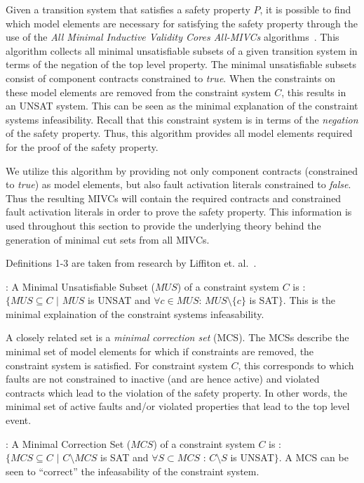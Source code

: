 Given a transition system that satisfies a safety property $P$, it is possible to find which model elements are necessary for satisfying the safety property through the use of the \textit{All Minimal Inductive Validity Cores All-MIVCs} algorithms~\cite{Ghassabani2017EfficientGO,bendik2018online}. This algorithm collects all minimal unsatisfiable subsets of a given transition system in terms of the negation of the top level property. The minimal unsatisfiable subsets consist of component contracts constrained to \textit{true}. When the constraints on these model elements are removed from the constraint system $C$, this results in an UNSAT system. This can be seen as the minimal explanation of the constraint systems infeasibility. Recall that this constraint system is in terms of the \textit{negation} of the safety property. Thus, this algorithm provides all model elements required for the proof of the safety property. 

We utilize this algorithm by providing not only component contracts (constrained to \textit{true}) as model elements, but also fault activation literals constrained to \textit{false}. Thus the resulting MIVCs will contain the required contracts and constrained fault activation literals in order to prove the safety property. This information is used throughout this section to provide the underlying theory behind the generation of minimal cut sets from all MIVCs. 

Definitions 1-3 are taken from research by Liffiton et. al.~\cite{liffiton2016fast}. 

\begin{definition} : A Minimal Unsatisfiable Subset ($MUS$) of a constraint system $C$ is :\\
 $\{MUS \subseteq C$ $|$ $MUS$ is UNSAT and $\forall c \in MUS$: $MUS \setminus \{c\}$ is SAT$\}$. This is the minimal explaination of the constraint systems infeasability. 
\end{definition}

A closely related set is a \textit{minimal correction set} (MCS). The MCSs describe the minimal set of model elements for which if constraints are removed, the constraint system is satisfied. For constraint system $C$, this corresponds to which faults are not constrained to inactive (and are hence active) and violated contracts which lead to the violation of the safety property. In other words, the minimal set of active faults and/or violated properties that lead to the top level event.  

\begin{definition} : A Minimal Correction Set ($MCS$) of a constraint system $C$ is :\\
 $\{MCS \subseteq C$ $|$ $C \setminus MCS$ is SAT and $\forall S \subset MCS$ : $C \setminus S$ is UNSAT$\}$. A MCS can be seen to ``correct'' the infeasability of the constraint system.
\end{definition}

